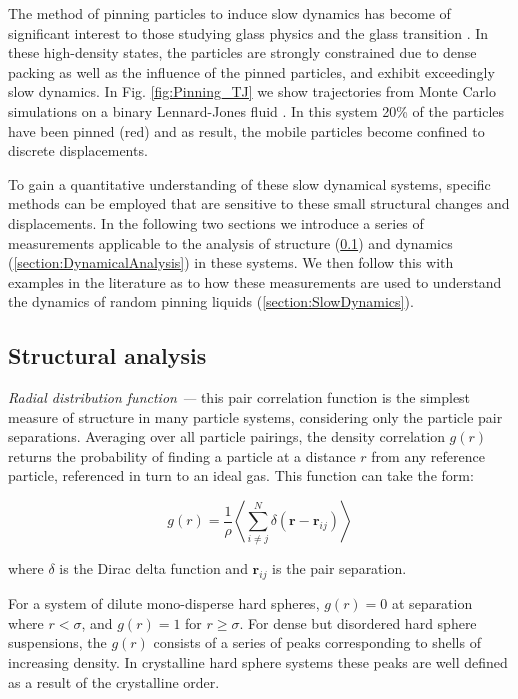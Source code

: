  The method of pinning particles to induce slow dynamics has become of significant interest to those studying glass physics and the glass transition \cite{cammarota2012,biroli2008,williams2018}. In these high-density states, the particles are strongly constrained due to dense packing as well as the influence of the pinned particles, and exhibit exceedingly slow dynamics. 
In Fig. \ref{fig:Pinning_TJ} we show trajectories from Monte Carlo simulations on a binary Lennard-Jones fluid \cite{ozawa2018}. In this system 20\% of the particles have been pinned (red) and as result, the mobile particles become confined to discrete displacements.


To gain a quantitative understanding of these slow dynamical systems, specific methods can be employed that are sensitive to these small structural changes and displacements. In the following two sections we introduce a series of measurements applicable to the analysis of structure (\ref{section:StructuralAnalysis}) and dynamics (\ref{section:DynamicalAnalysis}) in these systems. We then follow this with examples in the literature as to how these measurements are used to understand the dynamics of random pinning liquids (\ref{section:SlowDynamics}). 

\subsection{Structural analysis}
\label{section:StructuralAnalysis}

\textit{Radial distribution function ---} this pair correlation function is the simplest measure of structure in many particle systems, considering only the particle pair separations. Averaging over all particle pairings, the density correlation $g(r)$ returns the probability of finding a particle at a distance $r$ from any reference particle, referenced in turn to an ideal gas. This function can take the form:

\begin{equation}
g(r)=\frac{1}{\rho}\left\langle\sum_{i \neq j}^{N} \delta\left(\boldsymbol{r}-\boldsymbol{r}_{i j}\right)\right\rangle
\end{equation}

\noindent where $\delta$ is the Dirac delta function and $\mathbf{r}_{ij}$ is the pair separation.

For a system of dilute mono-disperse hard spheres, $g(r) = 0$ at separation where $r<\sigma$, and $g(r) = 1$ for $r \geq \sigma$. For dense but disordered hard sphere suspensions, the $g(r)$ consists of a series of peaks corresponding to shells of increasing density. In crystalline hard sphere systems these peaks are well defined as a result of the crystalline order.


